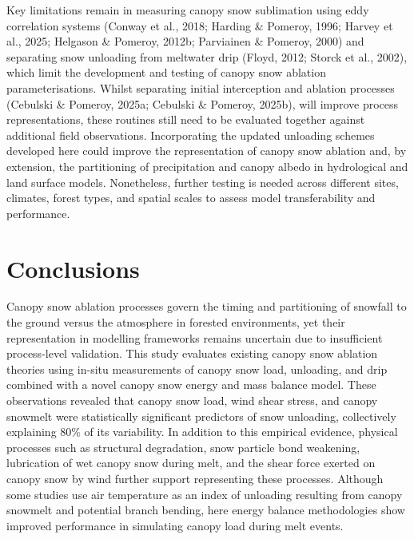 \documentclass[
]{agujournal2019}
\begin{document}
Key limitations remain in measuring canopy snow sublimation using eddy
correlation systems (Conway et al., 2018; Harding \& Pomeroy, 1996;
Harvey et al., 2025; Helgason \& Pomeroy, 2012b; Parviainen \& Pomeroy,
2000) and separating snow unloading from meltwater drip (Floyd, 2012;
Storck et al., 2002), which limit the development and testing of canopy
snow ablation parameterisations. Whilst separating initial interception
and ablation processes (Cebulski \& Pomeroy, 2025a; Cebulski \& Pomeroy,
2025b), will improve process representations, these routines still need
to be evaluated together against additional field observations.
Incorporating the updated unloading schemes developed here could improve
the representation of canopy snow ablation and, by extension, the
partitioning of precipitation and canopy albedo in hydrological and land
surface models. Nonetheless, further testing is needed across different
sites, climates, forest types, and spatial scales to assess model
transferability and performance.

\section{Conclusions}\label{conclusions}

Canopy snow ablation processes govern the timing and partitioning of
snowfall to the ground versus the atmosphere in forested environments,
yet their representation in modelling frameworks remains uncertain due
to insufficient process-level validation. This study evaluates existing
canopy snow ablation theories using in-situ measurements of canopy snow
load, unloading, and drip combined with a novel canopy snow energy and
mass balance model. These observations revealed that canopy snow load,
wind shear stress, and canopy snowmelt were statistically significant
predictors of snow unloading, collectively explaining 80\% of its
variability. In addition to this empirical evidence, physical processes
such as structural degradation, snow particle bond weakening,
lubrication of wet canopy snow during melt, and the shear force exerted
on canopy snow by wind further support representing these processes.
Although some studies use air temperature as an index of unloading
resulting from canopy snowmelt and potential branch bending, here energy
balance methodologies show improved performance in simulating canopy
load during melt events.
\end{document}
